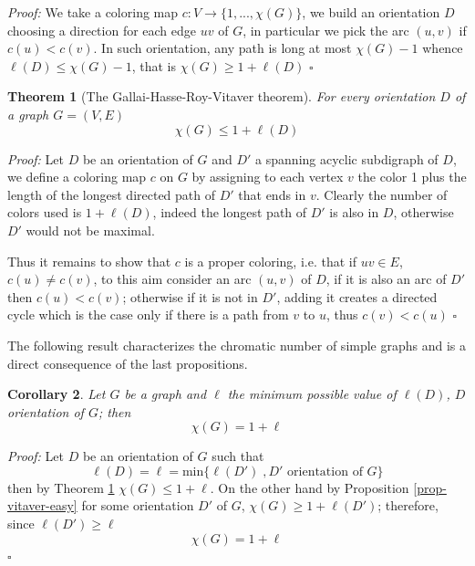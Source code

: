 \documentclass[a4paper,12pt,oneside]{book}
\newtheorem{theorem}{Theorem}[chapter]
\newtheorem{corollary}[theorem]{Corollary}
\newcommand*{\QED}{\hfill\ensuremath{\square}}
\begin{document}
\textit{Proof:}  We take a coloring map $c:V\rightarrow \{1,...,\chi (G)\}$, we build an orientation
 $D$ choosing a direction for each edge $uv$ of $G$, in particular we pick the arc 
 $(u,v)$ if $c(u)< c(v)$. In such orientation, any path is long at most $\chi 
 (G)-1$ whence $\ell(D)\leq \chi (G)-1  $, that is $ \chi (G) \geq 1+\ell(D) $ 
\QED

\begin{theorem}[The Gallai-Hasse-Roy-Vitaver theorem]\label{vitaver}
For every orientation $D$ of a graph $G=(V,E)$ $$\chi (G)\leq 1 + \ell(D)$$
\end{theorem}
\textit{Proof: }Let $D$ be an orientation of $G$ and $D'$ a spanning acyclic subdigraph of $D$, we define a coloring map $c$ on $G$ by assigning to each vertex $v$ the color 1 plus the length of the longest directed path of $D'$ that ends in $v$. Clearly the number of colors used is $1+\ell(D)$, indeed the longest path of $D'$ is also in $D$, otherwise $D'$ would not be maximal. 

Thus it remains to show that $c$ is a proper coloring, i.e. that if $uv\in E$, $c(u)\neq c(v) $, to this aim consider an arc $(u,v)$ of $D$, if it is also an arc of $D'$ then $c(u)<c(v)$; otherwise if it is not in $D'$, adding it creates a directed cycle which is the case only if there is a path from $v$ to $u$, thus $c(v)<c(u)$ \QED

\noindent The following result characterizes the chromatic number of simple graphs and is a direct consequence of the last propositions.
\begin{corollary}\label{cor-vitaver}
Let $G$ be a graph and $\ell$ the minimum possible value of $\ell(D)$, $D$ orientation of $G$; then   
$$\chi (G)=1+\ell$$
\end{corollary}

\textit{Proof:}
Let $D$ be an orientation of $G$ such that 
$$\ell(D)=\ell=\textrm{min}\{\ell(D') \; 	,D' \textrm{ orientation of } G\}$$ 
then by Theorem \ref{vitaver} $\chi(G) \leq 1+\ell$. On the other hand by Proposition \ref{prop-vitaver-easy} for some orientation $D'$  of $G$, $\chi(G)\geq 1+\ell(D')$; therefore, since $\ell(D')\geq\ell$ 
$$\chi (G)=1+\ell$$\QED
\end{document}
